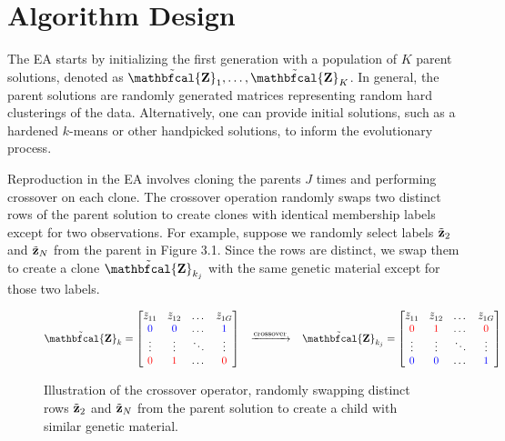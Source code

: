 \documentclass[12pt]{report}
\begin{document}
\section{Algorithm Design}
The EA starts by initializing the first generation with a population of $K$ parent solutions, denoted as $\tilde{\bf \mathbfcal{Z}}_1, \dots, \tilde{\bf \mathbfcal{Z}}_K$. In general, the parent solutions are randomly generated matrices representing random hard clusterings of the data. Alternatively, one can provide initial solutions, such as a hardened $k$-means or other handpicked solutions, to inform the evolutionary process.  

Reproduction in the EA involves cloning the parents $J$ times and performing crossover on each clone. The crossover operation randomly swaps two distinct rows of the parent solution to create clones with identical membership labels except for two observations. For example, suppose we randomly select labels $\tilde{\bf z}_2$ and $\tilde{\bf z}_N$ from the parent in Figure 3.1. Since the rows are distinct, we swap them to create a clone $\tilde{ \bf \mathbfcal{Z} }_{k_j}$ with the same genetic material except for those two labels.  
\begin{figure}[H]
$$\tilde{\bf {\mathbfcal{Z}}}_{k} = 
\begin{bmatrix} \tilde{z}_{11} & \tilde{z}_{12} & \dots & \tilde{z}_{1G} \\
    \textcolor{blue}{0} & \textcolor{blue}{0} & \dots & \textcolor{blue}{1} \\
    \vdots & \vdots & \ddots & \vdots \\
    \textcolor{red}{0}&\textcolor{red}{1}& \dots & \textcolor{red}{0}\\
\end{bmatrix} 
\;
\;
\;
\xrightarrow{\text{crossover}}
\;
\;
\;
\tilde{ \bf \mathbfcal{Z} }_{k_j} = 
\begin{bmatrix}
    \tilde{z}_{11} & \tilde{z}_{12} & \dots & \tilde{z}_{1G} \\
    \textcolor{red}{0} & \textcolor{red}{1} & \dots & \textcolor{red}{0} \\
    \vdots & \vdots & \ddots & \vdots \\
    \textcolor{blue}{0}&\textcolor{blue}{0}& \dots & \textcolor{blue}{1}\\
\end{bmatrix}   $$
\vspace{-0.5cm}
\caption{Illustration of the crossover operator, randomly swapping distinct rows $\tilde{\bf z}_2$ and $\tilde{\bf z}_N$ from the parent solution to create a child with similar genetic material.}
\end{figure}
\end{document}

